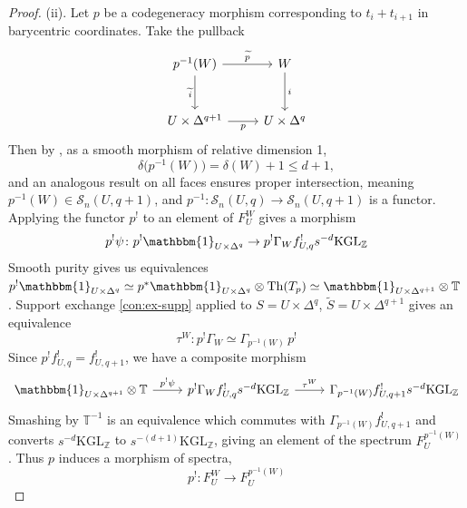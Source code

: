 \documentclass[11pt, twoside]{article}
\numberwithin{equation}{section}
\theoremstyle{definition}
\newcommand{\bb}[1]{\mathbb{#1}}
\newcommand{\Kgl}{\mathrm{KGL}}
\begin{document}
\begin{proof}
\item (ii). Let \(p\) be a codegeneracy morphism corresponding to \(t_i + t_{i + 1}\) in barycentric coordinates. Take the pullback 
\[\begin{tikzcd} [row sep = large]
p^{- 1}(W) \ar[d, "\tilde{i}", swap] \ar[r, "\tilde{p}"] & W \ar[d, "i"]\\
U \times \Delta^{q + 1} \ar[r, "p", swap] & U \times \Delta^q
\end{tikzcd}\]
Then by \cite[Tag 02R8]{Sta}, as a smooth morphism of relative dimension 1, 
\[\delta\big(p^{- 1}(W)\big) = \delta(W) + 1 \leq d + 1,\]
and an analogous result on all faces ensures proper intersection, meaning \(p^{- 1}(W) \in \mathcal{S}_n(U, q + 1)\), and \(p^{- 1} \colon \mathcal{S}_n(U, q) \to \mathcal{S}_n(U, q + 1)\) is a functor. Applying the functor \(p^!\) to an element of \(F_U^W\) gives a morphism 
\[p^! \psi \colon p^!\mathbbm{1}_{U \times \Delta^q} \to p^! \Gamma_W f_{U, q}^! s^{- d} \Kgl_\bb{Z}\]
Smooth purity gives us equivalences \(p^! \mathbbm{1}_{U \times \Delta^q} \simeq p^* \mathbbm{1}_{U \times \Delta^q} \otimes \mathrm{Th}(T_p) \simeq \mathbbm{1}_{U \times \Delta^{q + 1}} \otimes \bb{T}\). Support exchange \ref{con:ex-supp} applied to \(S = U \times \Delta^q\), \(\tilde{S} = U \times \Delta^{q + 1}\) gives an equivalence 
\[\tau^W \colon p^! \Gamma_W \simeq \Gamma_{p^{- 1}(W)} \, p^!\]
Since \(p^! f_{U, q}^! = f_{U, q + 1}^!\), we have a composite morphism 
\[\begin{tikzcd}
\mathbbm{1}_{U \times \Delta^{q + 1}} \otimes \bb{T} \ar[r, "p^! \psi"] & p^! \Gamma_W f_{U, q}^! s^{- d} \Kgl_\bb{Z} \ar[r, "\tau^W"] & \Gamma_{p^{- 1}(W)} f_{U, q + 1}^! s^{- d} \Kgl_\bb{Z}
\end{tikzcd}\]
Smashing by \(\bb{T}^{- 1}\) is an equivalence which commutes with \(\Gamma_{p^{- 1}(W)} f_{U, q + 1}^!\) and converts \(s^{- d} \Kgl_\bb{Z}\) to \(s^{- (d + 1)} \Kgl_\bb{Z}\), giving an element of the spectrum \(F_U^{p^{- 1}(W)}\). Thus \(p\) induces a morphism of spectra,
\[p^! \colon F_U^W \to F_U^{p^{- 1}(W)}\]


\end{proof}
\end{document}
